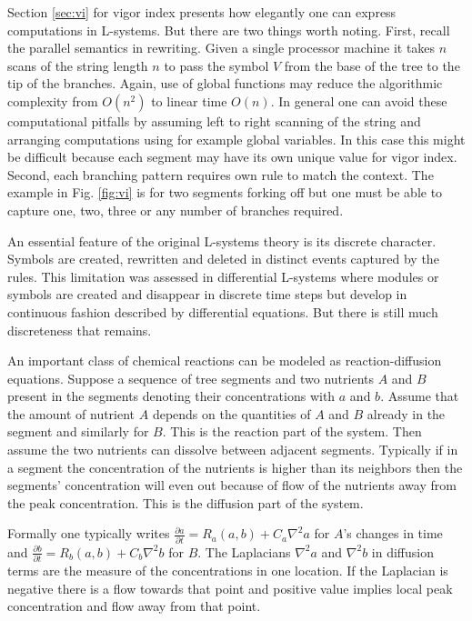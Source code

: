Section \ref{sec:vi}  for vigor index  presents how elegantly  one can
express  computations in L-systems.   But there  are two  things worth
noting.  First,  recall the parallel semantics in  rewriting.  Given a
single processor machine  it takes $n$ scans of  the string length $n$
to pass  the symbol $V$ from  the base of the  tree to the  tip of the
branches. Again,  use of global  functions may reduce  the algorithmic
complexity from  $O(n^2)$ to linear  time $O(n)$.  In general  one can
avoid these computational pitfalls  by assuming left to right scanning
of  the string  and arranging  computations using  for  example global
variables. In this  case this might be difficult  because each segment
may have its own unique value for vigor index.  Second, each branching
pattern requires own  rule to match the context.   The example in Fig.
\ref{fig:vi} is for  two segments forking off but one  must be able to
capture one, two, three or any number of branches required.

An essential feature of the  original L-systems theory is its discrete
character.   Symbols are  created, rewritten  and deleted  in distinct
events  captured  by  the  rules.   This limitation  was  assessed  in
differential L-systems \citep{hammel:96}  where modules or symbols are
created and disappear in discrete time steps but develop in continuous
fashion described  by differential equations. But there  is still much
discreteness that remains.

An  important   class  of  chemical   reactions  can  be   modeled  as
reaction-diffusion equations. Suppose a  sequence of tree segments and
two  nutrients $A$  and $B$  present  in the  segments denoting  their
concentrations with $a$  and $b$.  Assume that the  amount of nutrient
$A$ depends  on the quantities of  $A$ and $B$ already  in the segment
and similarly for $B$.  This is  the reaction part of the system. Then
assume  the  two nutrients  can  dissolve  between adjacent  segments.
Typically if in a segment the concentration of the nutrients is higher
than  its neighbors  then the  segments' concentration  will  even out
because of  flow of  the nutrients away  from the  peak concentration.
This  is the  diffusion part  of the  system.  

Formally  one  typically   writes  $\frac{\partial  a}{\partial  t}  =
R_a(a,b) + C_a\nabla^2a$ for $A$'s changes in time and $\frac{\partial
  b}{\partial t}  = R_b(a,b) + C_b\nabla^2b$ for  $B$.  The Laplacians
$\nabla^2 a$ and $\nabla^2 b$ \citep{thomas:92} in diffusion terms are
the measure of  the concentrations in one location.   If the Laplacian
is  negative there is  a flow  towards that  point and  positive value
implies local peak concentration and flow away from that point.

